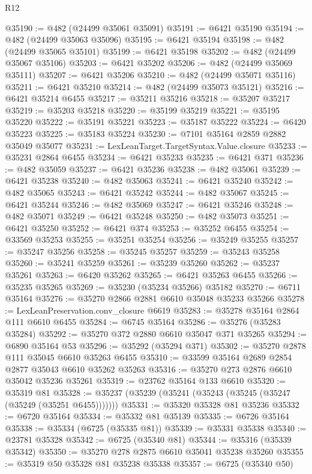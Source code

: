 \begin{lexlean}{R12}
\begin{coremodule}
@35190 := @482 (@24499 @35061 @35091)
@35191 := @6421 @35190
@35194 := @482 (@24499 @35063 @35096)
@35195 := @6421 @35194
@35198 := @482 (@24499 @35065 @35101)
@35199 := @6421 @35198
@35202 := @482 (@24499 @35067 @35106)
@35203 := @6421 @35202
@35206 := @482 (@24499 @35069 @35111)
@35207 := @6421 @35206
@35210 := @482 (@24499 @35071 @35116)
@35211 := @6421 @35210
@35214 := @482 (@24499 @35073 @35121)
@35216 := @6421 @35214 @6455
@35217 := @35211 @35216
@35218 := @35207 @35217
@35219 := @35203 @35218
@35220 := @35199 @35219
@35221 := @35195 @35220
@35222 := @35191 @35221
@35223 := @35187 @35222
@35224 := @6420 @35223
@35225 := @35183 @35224
@35230 := @7101 @35164 @2859 @2882 @35049 @35077
@35231 := LexLeanTarget.TargetSyntax.Value.closure
@35233 := @35231 @2864 @6455
@35234 := @6421 @35233
@35235 := @6421 @371
@35236 := @482 @35059
@35237 := @6421 @35236
@35238 := @482 @35061
@35239 := @6421 @35238
@35240 := @482 @35063
@35241 := @6421 @35240
@35242 := @482 @35065
@35243 := @6421 @35242
@35244 := @482 @35067
@35245 := @6421 @35244
@35246 := @482 @35069
@35247 := @6421 @35246
@35248 := @482 @35071
@35249 := @6421 @35248
@35250 := @482 @35073
@35251 := @6421 @35250
@35252 := @6421 @374
@35253 := @35252 @6455
@35254 := @33569 @35253
@35255 := @35251 @35254
@35256 := @35249 @35255
@35257 := @35247 @35256
@35258 := @35245 @35257
@35259 := @35243 @35258
@35260 := @35241 @35259
@35261 := @35239 @35260
@35262 := @35237 @35261
@35263 := @6420 @35262
@35265 := @6421 @35263 @6455
@35266 := @35235 @35265
@35269 := @35230 (@35234 @35266) @35182
@35270 := @6711 @35164
@35276 := @35270 @2866 @2881 @6610 @35048 @35233 @35266
@35278 := LexLeanPreservation.conv_closure @6619
@35283 := @35278 @35164 @2864 @111 @6610 @6455
@35284 := @6745 @35164
@35286 := @35276 (@35283 @35284)
@35292 := @35270 @372 @2880 @6610 @35047 @371 @35265
@35294 := @6890 @35164 @53
@35296 := @35292 (@35294 @371)
@35302 := @35270 @2878 @111 @35045 @6610 @35263 @6455
@35310 := @33599 @35164 @2689 @2854 @2877 @35043 @6610 @35262 @35263
@35316 := @35270 @273 @2876 @6610 @35042 @35236 @35261
@35319 := @23762 @35164 @133 @6610
@35320 := @35319 @81
@35328 := @35237 (@35239 (@35241 (@35243 (@35245 (@35247 (@35249 (@35251 @6455)))))))
@35331 := @35320 @35328 @81 @35236
@35332 := @6720 @35164
@35334 := @35332 @81 @35139
@35335 := @6726 @35164
@35338 := @35334 (@6725 (@35335 @81))
@35339 := @35331 @35338
@35340 := @23781 @35328
@35342 := @6725 (@35340 @81)
@35344 := @35316 (@35339 @35342)
@35350 := @35270 @278 @2875 @6610 @35041 @35238 @35260
@35355 := @35319 @50 @35328 @81 @35238 @35338
@35357 := @6725 (@35340 @50)

\end{coremodule}
\end{lexlean}

